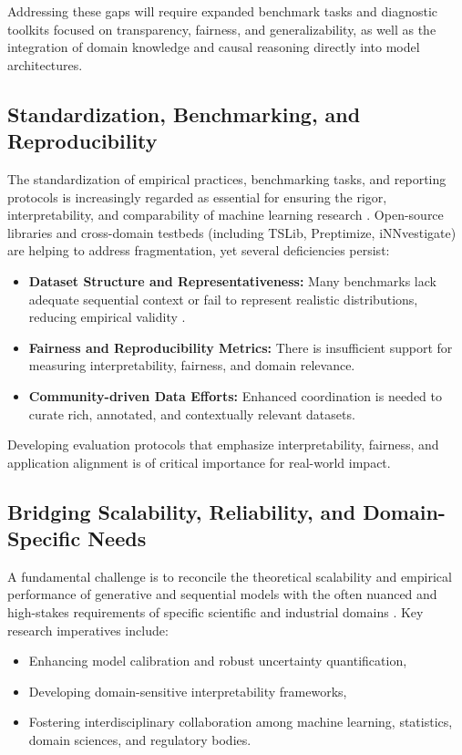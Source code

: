 Addressing these gaps will require expanded benchmark tasks and diagnostic toolkits focused on transparency, fairness, and generalizability, as well as the integration of domain knowledge and causal reasoning directly into model architectures.

\subsection{Standardization, Benchmarking, and Reproducibility}
\label{subsec:standardization}

The standardization of empirical practices, benchmarking tasks, and reporting protocols is increasingly regarded as essential for ensuring the rigor, interpretability, and comparability of machine learning research \cite{ref85,ref86,ref87}. Open-source libraries and cross-domain testbeds (including TSLib, Preptimize, iNNvestigate) are helping to address fragmentation, yet several deficiencies persist:

\begin{itemize}
    \item \textbf{Dataset Structure and Representativeness:} Many benchmarks lack adequate sequential context or fail to represent realistic distributions, reducing empirical validity \cite{ref87}.
    \item \textbf{Fairness and Reproducibility Metrics:} There is insufficient support for measuring interpretability, fairness, and domain relevance.
    \item \textbf{Community-driven Data Efforts:} Enhanced coordination is needed to curate rich, annotated, and contextually relevant datasets.
\end{itemize}

Developing evaluation protocols that emphasize interpretability, fairness, and application alignment is of critical importance for real-world impact.

\subsection{Bridging Scalability, Reliability, and Domain-Specific Needs}

A fundamental challenge is to reconcile the theoretical scalability and empirical performance of generative and sequential models with the often nuanced and high-stakes requirements of specific scientific and industrial domains \cite{ref82,ref84,ref86,ref87}. Key research imperatives include:

\begin{itemize}
    \item Enhancing model calibration and robust uncertainty quantification,
    \item Developing domain-sensitive interpretability frameworks,
    \item Fostering interdisciplinary collaboration among machine learning, statistics, domain sciences, and regulatory bodies.
\end{itemize}


